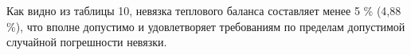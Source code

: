 % 

Как видно из таблицы 10, невязка теплового баланса составляет менее 5 \%
(4,88 \%), что вполне допустимо и удовлетворяет требованиям по пределам
допустимой случайной погрешности невязки.

